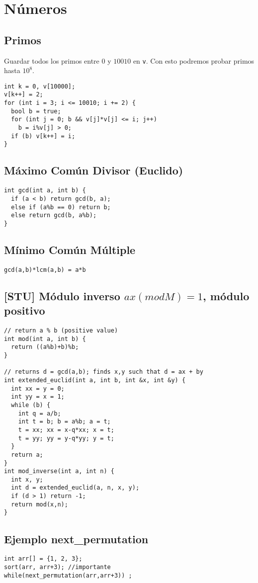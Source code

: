 \documentclass[10pt, a4, oneside]{article}
\begin{document}
\section{Números}
\subsection{Primos}
Guardar todos los primos entre $0$ y $10010$ en \verb-v-. Con esto podremos
probar primos hasta $10^8$.
\begin{verbatim}
int k = 0, v[10000];
v[k++] = 2; 
for (int i = 3; i <= 10010; i += 2) {
  bool b = true;
  for (int j = 0; b && v[j]*v[j] <= i; j++)
    b = i%v[j] > 0;
  if (b) v[k++] = i;
}
\end{verbatim}
\subsection{Máximo Común Divisor (Euclido)}
\begin{verbatim}
int gcd(int a, int b) {
  if (a < b) return gcd(b, a);
  else if (a%b == 0) return b;
  else return gcd(b, a%b);
}
\end{verbatim}
\subsection{Mínimo Común Múltiple}
\verb-gcd(a,b)*lcm(a,b) = a*b-
\subsection{[STU] Módulo inverso $ax (mod M) = 1$, módulo positivo}
\begin{verbatim}
// return a % b (positive value)
int mod(int a, int b) {
  return ((a%b)+b)%b;
}

// returns d = gcd(a,b); finds x,y such that d = ax + by
int extended_euclid(int a, int b, int &x, int &y) {  
  int xx = y = 0;
  int yy = x = 1;
  while (b) {
    int q = a/b;
    int t = b; b = a%b; a = t;
    t = xx; xx = x-q*xx; x = t;
    t = yy; yy = y-q*yy; y = t;
  }
  return a;
}
int mod_inverse(int a, int n) {
  int x, y;
  int d = extended_euclid(a, n, x, y);
  if (d > 1) return -1;
  return mod(x,n);
}
\end{verbatim}
\subsection{Ejemplo next\_permutation}
\begin{verbatim}
int arr[] = {1, 2, 3};
sort(arr, arr+3); //importante
while(next_permutation(arr,arr+3)) ;
\end{verbatim}
\end{document}
